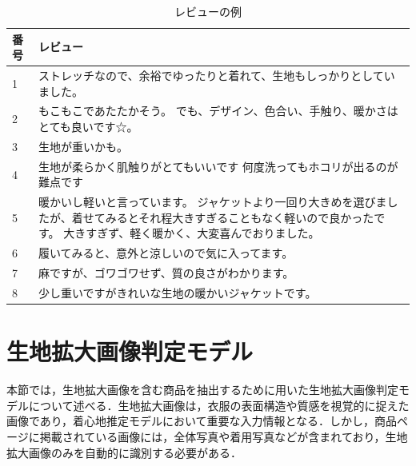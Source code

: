\documentclass[a4paper,12pt]{jreport}
\begin{document}
\begin{table}[tbh]
\begin{center}
\caption{レビューの例}
\vspace{7mm}
\label{tab:5.2}
\begin{tabular}{|l|p{13cm}|}
\hline
番号 & レビュー                                                                                         \\ \hline
1  & ストレッチなので、余裕でゆったりと着れて、生地もしっかりとしていました。                                                         \\ \hline
2  & もこもこであたたかそう。   でも、デザイン、色合い、手触り、暖かさはとても良いです☆。                                                 \\ \hline
3  & 生地が重いかも。                                                                                     \\ \hline
4  & 生地が柔らかく肌触りがとてもいいです   何度洗ってもホコリが出るのが難点です                                                      \\ \hline
5  & 暖かいし軽いと言っています。   ジャケットより一回り大きめを選びましたが、着せてみるとそれ程大きすぎることもなく軽いので良かったです。 大きすぎず、軽く暖かく、大変喜んでおりました。 \\ \hline
6  & 履いてみると、意外と涼しいので気に入ってます。                                                                      \\ \hline
7  & 麻ですが、ゴワゴワせず、質の良さがわかります。                                                                      \\ \hline
8  & 少し重いですがきれいな生地の暖かいジャケットです。                                                                    \\ \hline
\end{tabular}
\end{center}
\end{table}

\section{生地拡大画像判定モデル}
本節では，生地拡大画像を含む商品を抽出するために用いた生地拡大画像判定モデルについて述べる．生地拡大画像は，衣服の表面構造や質感を視覚的に捉えた画像であり，着心地推定モデルにおいて重要な入力情報となる．しかし，商品ページに掲載されている画像には，全体写真や着用写真などが含まれており，生地拡大画像のみを自動的に識別する必要がある．
\end{document}
